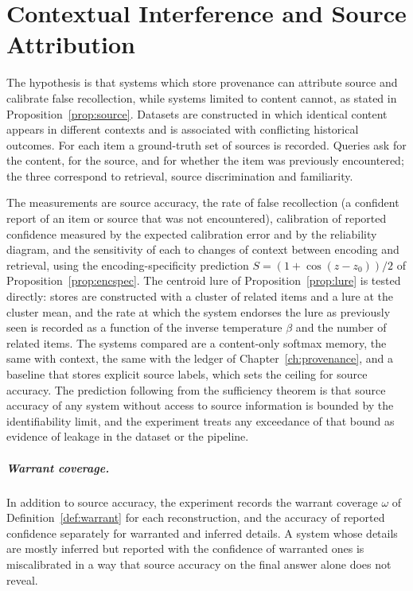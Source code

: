 \chapter{Contextual Interference and Source Attribution}\label{ch:source-exp}

The hypothesis is that systems which store provenance can attribute source and calibrate false recollection, while systems limited to content cannot, as stated in Proposition~\ref{prop:source}. Datasets are constructed in which identical content appears in different contexts and is associated with conflicting historical outcomes. For each item a ground-truth set of sources is recorded. Queries ask for the content, for the source, and for whether the item was previously encountered; the three correspond to retrieval, source discrimination and familiarity.

The measurements are source accuracy, the rate of false recollection (a confident report of an item or source that was not encountered), calibration of reported confidence measured by the expected calibration error and by the reliability diagram, and the sensitivity of each to changes of context between encoding and retrieval, using the encoding-specificity prediction $S=(1+\cos(z-z_0))/2$ of Proposition~\ref{prop:encspec}. The centroid lure of Proposition~\ref{prop:lure} is tested directly: stores are constructed with a cluster of related items and a lure at the cluster mean, and the rate at which the system endorses the lure as previously seen is recorded as a function of the inverse temperature $\beta$ and the number of related items. The systems compared are a content-only softmax memory, the same with context, the same with the ledger of Chapter~\ref{ch:provenance}, and a baseline that stores explicit source labels, which sets the ceiling for source accuracy. The prediction following from the sufficiency theorem is that source accuracy of any system without access to source information is bounded by the identifiability limit, and the experiment treats any exceedance of that bound as evidence of leakage in the dataset or the pipeline.

\paragraph{Warrant coverage.} In addition to source accuracy, the experiment records the warrant coverage $\omega$ of Definition~\ref{def:warrant} for each reconstruction, and the accuracy of reported confidence separately for warranted and inferred details. A system whose details are mostly inferred but reported with the confidence of warranted ones is miscalibrated in a way that source accuracy on the final answer alone does not reveal.

